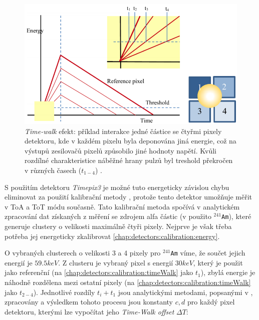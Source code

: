 \begin{figure}
	\begin{center}
		\includegraphics[width=12cm]{figures/calib_timeWalk.png}
		\caption{\textit{Time-walk} efekt: příklad interakce jedné částice se čtyřmi pixely detektoru, kde v každém pixelu byla deponována jiná energie, což na výstupů zesilovačů pixelů způsobilo jiné hodnoty napětí. Kvůli rozdílné charakteristice náběžné hrany pulzů byl treshold překročen v různých časech ($t_{1-4}$) \cite{Turecek2016TimeWakl}.}
		\label{fig:det:calib:timeWalk}
	\end{center}
\end{figure}

S použitím detektoru \textit{Timepix3}\cite{timepix3} je možné tuto energeticky závislou chybu eliminovat za použití kalibrační metody \cite{Turecek2016TimeWakl}, protože tento detektor umožňuje měřit v ToA a ToT módu současně. Tato kalibrační metoda spočívá v analytickém zpracování dat získaných z měření se zdrojem alfa částic (v \cite{Turecek2016TimeWakl} použito $^{241}$\texttt{Am}), které generuje clustery o velikosti maximálně čtyři pixely. Nejprve je však třeba potřeba jej energeticky zkalibrovat \ref{chap:detectors:calibration:energy}. 

O vybraných clusterech o velikosti 3 a 4 pixely pro $^{241}$\texttt{Am} víme, že součet jejich energií je $59.5keV$. Z clusteru je vybraný pixel s energií $30keV$, který je použit jako referenční (na \ref{chap:detectors:calibration:timeWalk} jako $t_1$), zbylá energie je náhodně rozdělena mezi ostatní pixely (na \ref{chap:detectors:calibration:timeWalk} jako $t_{2-4}$). Jednotlivé rozdíly $t_i+t_1$ jsou analytickými metodami, popsanými v \cite{Turecek2016TimeWakl}, zpracovány a výsledkem tohoto procesu jsou konstanty $c,d$ pro každý pixel detektoru, kterými lze vypočítat jeho \textit{Time-Walk offset} $\Delta T$:

